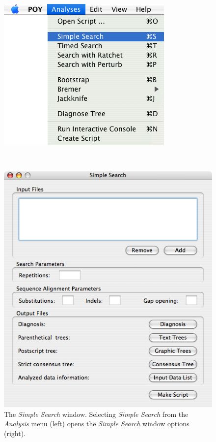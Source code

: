 \begin{figure}
\centering
\begin{minipage}[c]{0.45\textwidth}
   		\includegraphics[width=\textwidth]{doc/figures/simplesearch_menu.jpg}
\end{minipage}
\,
\begin{minipage}[c]{0.52\textwidth}
	   	\includegraphics[width=\textwidth]{doc/figures/simplesearch_window.jpg}
   	\end{minipage}
	
\caption{The \emph{Simple Search} window. Selecting \emph{Simple Search} from the \emph{Analysis} menu (left) opens the \emph{Simple Search} window options (right).}
\label{fig:simple_search_window}
\end{figure}


